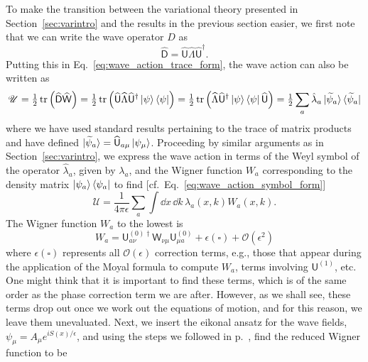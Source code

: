 To make the transition between the variational theory presented in Section~\ref{sec:varintro} and the results in the previous section easier, we first note that we can write the wave operator $\widehat{D}$ as
%
\begin{equation}
  \widehat{\mathsf{D}} = \widehat{\mathsf{U}}\widehat{\Lambda}\widehat{\mathsf{U}}^{\dagger}.
\end{equation}
%
Putting this in Eq.~\eqref{eq:wave_action_trace_form}, the wave action can also be written as
%
\begin{equation}
  \mathscr{U} = \tfrac{1}{2}\operatorname{tr}\left(\widehat{\mathsf{D}}\widehat{\mathsf{W}}\right) = \tfrac{1}{2}\operatorname{tr}\left(\widehat{\mathsf{U}}\widehat{\Lambda}\widehat{\mathsf{U}}^{\dagger}\mathinner{\lvert{\psi}\rangle}\mathinner{\langle{\psi}\rvert}\right) = \tfrac{1}{2}\operatorname{tr}\left(\widehat{\Lambda}\widehat{\mathsf{U}}^{\dagger}\mathinner{\lvert{\psi}\rangle}\mathinner{\langle{\psi}\rvert}\widehat{\mathsf{U}}\right)
  = \tfrac{1}{2}\sum_{a} \hat{\lambda}_{a}\mathinner{\lvert{\widetilde{\psi}_{a}}\rangle}\mathinner{\langle{\widetilde{\psi}_{a}}\rvert}
\end{equation}
%
where we have used standard results pertaining to the trace of matrix products and have defined $\mathinner{\lvert{\widetilde{\psi}_{a}}\rangle} = \widehat{\mathsf{U}}_{a\mu}\mathinner{\lvert{\psi_{\mu}}\rangle}$.
Proceeding by similar arguments as in Section~\ref{sec:varintro}, we express the wave action in terms of the Weyl symbol of the operator $\hat{\lambda}_{a}$, given by $\lambda_{a}$,  and the Wigner function $W_{a}$ corresponding to the density matrix $\mathinner{\lvert{\psi_{a}}\rangle}\mathinner{\langle{\psi_{a}}\rvert}$ to find [cf.~Eq.~\eqref{eq:wave_action_symbol_form}]
%
\begin{equation}
  \mathscr{U} = \frac{1}{4\pi\epsilon}\sum_{a}\int \dd{x}\,\dd{k}\, \lambda_{a}(x, k) W_{a}(x, k).
\end{equation}
%
The Wigner function $W_{a}$ to the lowest is
%
\begin{equation}
  W_{a} = \mathsf{U}^{(0)\dagger}_{a\nu}\mathsf{W}_{\nu\mu}\mathsf{U}^{(0)}_{\mu a} + \epsilon(\square) + \mathcal{O}(\epsilon^{2})
\end{equation}
%
where $\epsilon(\square)$ represents all $\mathcal{O}(\epsilon)$ correction terms, e.g., those that appear during the application of the Moyal formula to compute $W_{a}$, terms involving $\mathsf{U}^{(1)}$, etc.
One might think that it is important to find these terms, which is of the same order as the phase correction term we are after.
However, as we shall see, these terms drop out once we work out the equations of motion, and for this reason, we leave them unevaluated.
Next, we insert the eikonal ansatz for the wave fields, $\psi_{\mu} = A_{\mu}e^{iS(x)/\epsilon}$, and using the steps we followed in p.~\pageref{page:redaction}, find the reduced Wigner function to be
